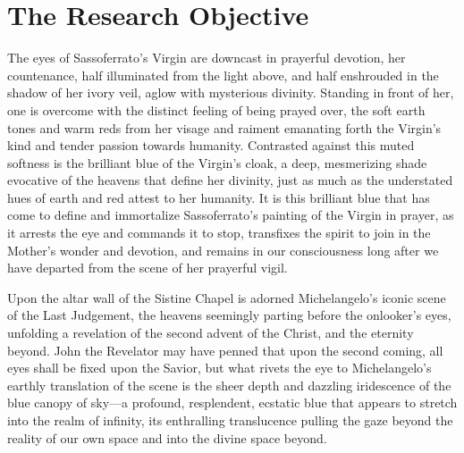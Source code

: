     
    
    
    

    \hypertarget{The Research Objective}{\chapter{The Research Objective}\label{The Research Objective}}
    The eyes of Sassoferrato's Virgin are downcast in prayerful devotion,
her countenance, half illuminated from the light above, and half
enshrouded in the shadow of her ivory veil, aglow with mysterious
divinity. Standing in front of her, one is overcome with the distinct
feeling of being prayed over, the soft earth tones and warm reds from
her visage and raiment emanating forth the Virgin's kind and tender
passion towards humanity. Contrasted against this muted softness is the
brilliant blue of the Virgin's cloak, a deep, mesmerizing shade
evocative of the heavens that define her divinity, just as much as the
understated hues of earth and red attest to her humanity. It is this
brilliant blue that has come to define and immortalize Sassoferrato's
painting of the Virgin in prayer, as it arrests the eye and commands it
to stop, transfixes the spirit to join in the Mother's wonder and
devotion, and remains in our consciousness long after we have departed
from the scene of her prayerful vigil.

Upon the altar wall of the Sistine Chapel is adorned Michelangelo's
iconic scene of the Last Judgement, the heavens seemingly parting before
the onlooker's eyes, unfolding a revelation of the second advent of the
Christ, and the eternity beyond. John the Revelator may have penned that
upon the second coming, all eyes shall be fixed upon the Savior, but
what rivets the eye to Michelangelo's earthly translation of the scene
is the sheer depth and dazzling iridescence of the blue canopy of
sky---a profound, resplendent, ecstatic blue that appears to stretch
into the realm of infinity, its enthralling translucence pulling the
gaze beyond the reality of our own space and into the divine space
beyond.

